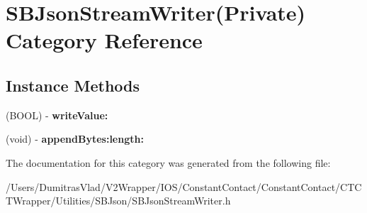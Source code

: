 \hypertarget{category_s_b_json_stream_writer_07_private_08}{\section{S\-B\-Json\-Stream\-Writer(Private) Category Reference}
\label{category_s_b_json_stream_writer_07_private_08}
}
\subsection*{Instance Methods}
\begin{DoxyCompactItemize}
\item 
\hypertarget{category_s_b_json_stream_writer_07_private_08_ad07ba844e4c471660daf9b5dfcb43e8e}{(B\-O\-O\-L) -\/ {\bfseries write\-Value\-:}}\label{category_s_b_json_stream_writer_07_private_08_ad07ba844e4c471660daf9b5dfcb43e8e}

\item 
\hypertarget{category_s_b_json_stream_writer_07_private_08_a27c7af220a32b2dedd15106e435a7df9}{(void) -\/ {\bfseries append\-Bytes\-:length\-:}}\label{category_s_b_json_stream_writer_07_private_08_a27c7af220a32b2dedd15106e435a7df9}

\end{DoxyCompactItemize}


The documentation for this category was generated from the following file\-:\begin{DoxyCompactItemize}
\item 
/\-Users/\-Dumitras\-Vlad/\-V2\-Wrapper/\-I\-O\-S/\-Constant\-Contact/\-Constant\-Contact/\-C\-T\-C\-T\-Wrapper/\-Utilities/\-S\-B\-Json/S\-B\-Json\-Stream\-Writer.\-h\end{DoxyCompactItemize}
